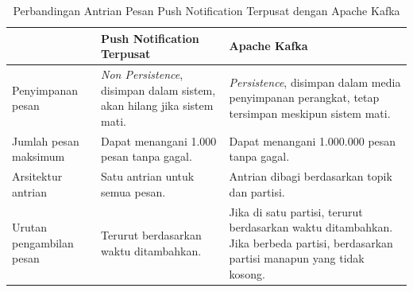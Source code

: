 \clearpage
\begin{longtable}{|p{2.5cm}|p{3.5cm}|p{3.5cm}|}
	\caption{Perbandingan Antrian Pesan Push Notification Terpusat dengan Apache Kafka} \label{t:perbandingan_kafka} \\ \hline
	\rowcolor{lightgray} & Push Notification Terpusat & Apache Kafka \\ \hline
	Penyimpanan pesan & \textit{Non Persistence}, disimpan dalam sistem, akan hilang jika sistem mati. & \textit{Persistence}, disimpan dalam media penyimpanan perangkat, tetap tersimpan meskipun sistem mati. \\ \hline
	Jumlah pesan maksimum & Dapat menangani 1.000 pesan tanpa gagal. & Dapat menangani 1.000.000 pesan tanpa gagal. \\ \hline
	Arsitektur antrian & Satu antrian untuk semua pesan. & Antrian dibagi berdasarkan topik dan partisi. \\ \hline
	Urutan pengambilan pesan & Terurut berdasarkan waktu ditambahkan. & Jika di satu partisi, terurut berdasarkan waktu ditambahkan. Jika berbeda partisi, berdasarkan partisi manapun yang tidak kosong. \\ \hline
\end{longtable}


